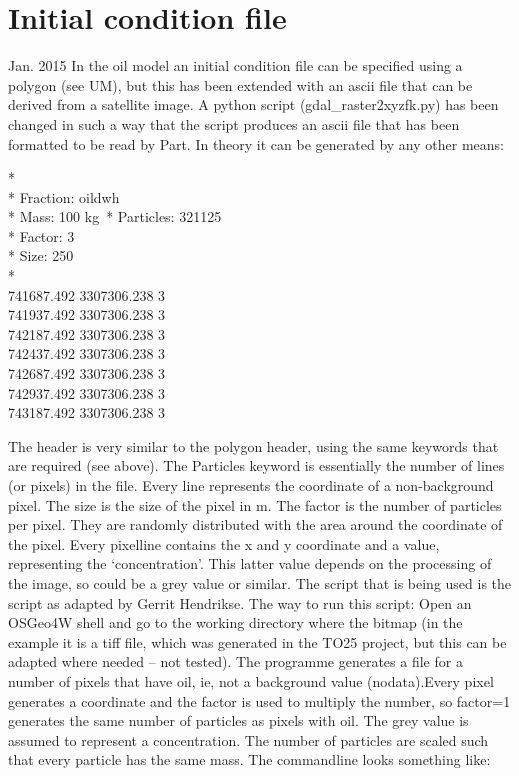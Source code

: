 \documentclass[english]{deltares_manual}
\begin{document}
\section{Initial condition file}
Jan. 2015
In the oil model an initial condition file can be specified using a polygon (see UM), but this has been extended with an ascii  file that can be derived from a satellite image. A python script (gdal\_raster2xyzfk.py) has been changed in such a way that the script produces an ascii file that has been formatted to be read by Part. In theory it can be generated by any other means:
\begin{tcolorbox}
*\\
* Fraction: oildwh\\
* Mass: 100 kg\
* Particles: 321125\\
* Factor: 3\\
* Size: 250\\
*\\
741687.492 3307306.238 3\\
741937.492 3307306.238 3\\
742187.492 3307306.238 3\\
742437.492 3307306.238 3\\
742687.492 3307306.238 3\\
742937.492 3307306.238 3\\
743187.492 3307306.238 3\\
\end{tcolorbox}

The header is very similar to the polygon header, using the same keywords that are required (see above). The Particles keyword is essentially the number of lines (or pixels) in the file. Every line represents the coordinate of a non-background pixel. The size is the size of the pixel in m. The factor is the number of particles per pixel. They are randomly distributed with the area around the coordinate of the pixel. Every pixelline contains the x and y coordinate and a value, representing the ‘concentration’. This latter value depends on the processing of the image, so could be a grey value or similar.  
The script that is being used is the script \file{gdal\_raster2xyz.py} as adapted by Gerrit Hendrikse. The way to run this script:
Open an OSGeo4W shell and go to the working directory where the bitmap (in the example it is a tiff file, which was generated in the TO25 project, but this can be adapted where needed – not tested). The programme generates a file for a number of pixels that have oil, ie, not a background value (nodata).Every pixel generates a coordinate and the factor is used to multiply the number, so factor=1 generates the same number of particles as pixels with oil. The grey value is assumed to represent a concentration. The number of particles are scaled such that every particle has the same mass. The commandline looks something like:
\end{document}
